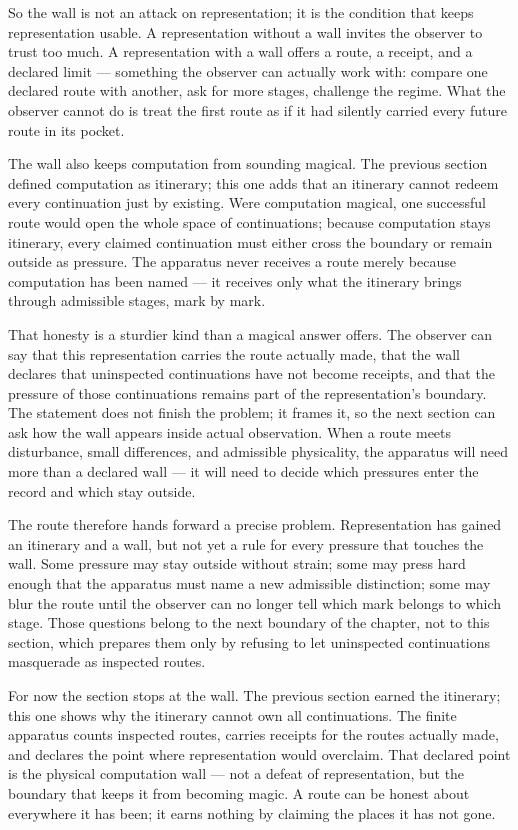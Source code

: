 So the wall is not an attack on representation; it is the condition that keeps representation usable. A representation without a wall invites the observer to trust too much. A representation with a wall offers a route, a receipt, and a declared limit --- something the observer can actually work with: compare one declared route with another, ask for more stages, challenge the regime. What the observer cannot do is treat the first route as if it had silently carried every future route in its pocket.

The wall also keeps computation from sounding magical. The previous section defined computation as itinerary; this one adds that an itinerary cannot redeem every continuation just by existing. Were computation magical, one successful route would open the whole space of continuations; because computation stays itinerary, every claimed continuation must either cross the boundary or remain outside as pressure. The apparatus never receives a route merely because computation has been named --- it receives only what the itinerary brings through admissible stages, mark by mark.

That honesty is a sturdier kind than a magical answer offers. The observer can say that this representation carries the route actually made, that the wall declares that uninspected continuations have not become receipts, and that the pressure of those continuations remains part of the representation's boundary. The statement does not finish the problem; it frames it, so the next section can ask how the wall appears inside actual observation. When a route meets disturbance, small differences, and admissible physicality, the apparatus will need more than a declared wall --- it will need to decide which pressures enter the record and which stay outside.

The route therefore hands forward a precise problem. Representation has gained an itinerary and a wall, but not yet a rule for every pressure that touches the wall. Some pressure may stay outside without strain; some may press hard enough that the apparatus must name a new admissible distinction; some may blur the route until the observer can no longer tell which mark belongs to which stage. Those questions belong to the next boundary of the chapter, not to this section, which prepares them only by refusing to let uninspected continuations masquerade as inspected routes.

For now the section stops at the wall. The previous section earned the itinerary; this one shows why the itinerary cannot own all continuations. The finite apparatus counts inspected routes, carries receipts for the routes actually made, and declares the point where representation would overclaim. That declared point is the physical computation wall --- not a defeat of representation, but the boundary that keeps it from becoming magic. A route can be honest about everywhere it has been; it earns nothing by claiming the places it has not gone.

